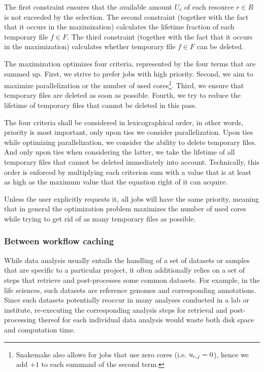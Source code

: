 \documentclass[parskip=half]{scrartcl}
\begin{document}
The first constraint ensures that the available amount $U_r$ of each resource $r \in R$ is not exceeded by the selection.
The second constraint (together with the fact that it occurs in the maximization) calculates the lifetime fraction of each temporary file $f \in F$.
The third constraint (together with the fact that it occurs in the maximization) calculates whether temporary file $f \in F$ can be deleted.

The maximization optimizes four criteria, represented by the four terms that are summed up.
First, we strive to prefer jobs with high priority.
Second, we aim to maximize parallelization or the number of used cores\footnote{Snakemake also allows for jobs that use zero cores (i.e. $u_{\text{c},j} = 0$), hence we add $+1$ to each summand of the second term.
}.
Third, we ensure that temporary files are deleted as soon as possible.
Fourth, we try to reduce the lifetime of temporary files that cannot be deleted in this pass.

The four criteria shall be considered in lexicographical order, in other words, priority is most important, only upon ties we consider parallelization.
Upon ties while optimizing parallelization, we consider the ability to delete temporary files.
And only upon ties when considering the latter, we take the lifetime of all temporary files that cannot be deleted immediately into account.
Technically, this order is enforced by multiplying each criterion sum with a value that is at least as high as the maximum value that the equation right of it can acquire.

Unless the user explicitly requests it, all jobs will have the same priority, meaning that in general the optimization problem maximizes the number of used cores while trying to get rid of as many temporary files as possible.

\subsubsection{Between workflow caching}

While data analysis usually entails the handling of a set of datasets or samples that are specific to a particular project, it often additionally relies on a set of steps that retrieve and post-processes some common datasets.
For example, in the life sciences, such datasets are reference genomes and corresponding annotations.
Since such datasets potentially reoccur in many analyses conducted in a lab or institute, re-executing the corresponding analysis steps for retrieval and post-processing thereof for each individual data analysis would waste both disk space and computation time.
\end{document}
